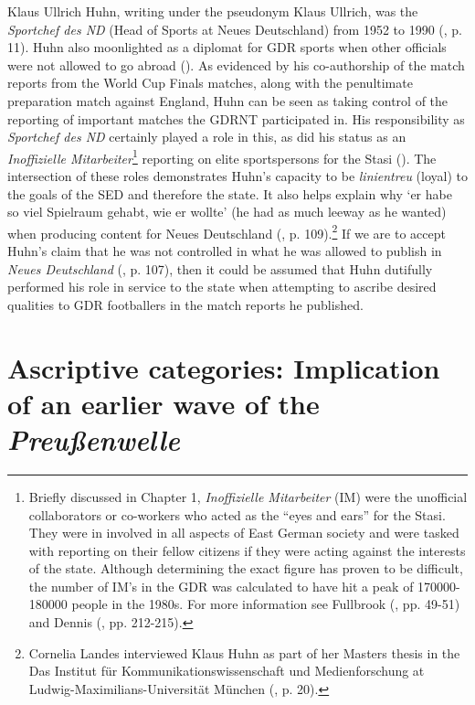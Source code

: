 Klaus Ullrich Huhn, writing under the pseudonym Klaus Ullrich, was the \textit{Sportchef des ND} (Head of Sports at Neues Deutschland) from 1952 to 1990 (\cite{meyenfiedler2011}, p. 11). Huhn also moonlighted as a diplomat for GDR sports when other officials were not allowed to go abroad (\cite{meyenfiedler2011}). As evidenced by his co-authorship of the match reports from the World Cup Finals matches, along with the penultimate preparation match against England, Huhn can be seen as taking control of the reporting of important matches the GDRNT participated in. His responsibility as \textit{Sportchef des ND} certainly played a role in this, as did his status as an \textit{Inoffizielle Mitarbeiter}\footnote{Briefly discussed in Chapter 1, \textit{Inoffizielle Mitarbeiter} (IM) were the unofficial collaborators or co-workers who acted as the “eyes and ears” for the Stasi. They were in involved in all aspects of East German society and were tasked with reporting on their fellow citizens if they were acting against the interests of the state. Although determining the exact figure has proven to be difficult, the number of IM’s in the GDR was calculated to have hit a peak of 170000-180000 people in the 1980s. For more information see Fullbrook (\citeyear{fullbrook1995}, pp. 49-51) and Dennis (\cite{dennis2000}, pp. 212-215).} reporting on elite sportspersons for the Stasi (\cite{brinkbäumeretal1999}). The intersection of these roles demonstrates Huhn’s capacity to be \textit{linientreu} (loyal) to the goals of the SED and therefore the state. It also helps explain why ‘er habe so viel Spielraum gehabt, wie er wollte’ (he had as much leeway as he wanted) when producing content for Neues Deutschland (\cite{landes2011}, p. 109).\footnote{Cornelia Landes interviewed Klaus Huhn as part of her Masters thesis in the Das Institut für Kommunikationswissenschaft und Medienforschung at Ludwig-Maximilians-Universität München (\cite{fiedlermeyen2011}, p. 20).} If we are to accept Huhn’s claim that he was not controlled in what he was allowed to publish in \textit{Neues Deutschland} (\cite{landes2011}, p. 107), then it could be assumed that Huhn dutifully performed his role in service to the state when attempting to ascribe desired qualities to GDR footballers in the match reports he published.

\section*{Ascriptive categories: Implication of an earlier wave of the \textit{Preußenwelle}}


